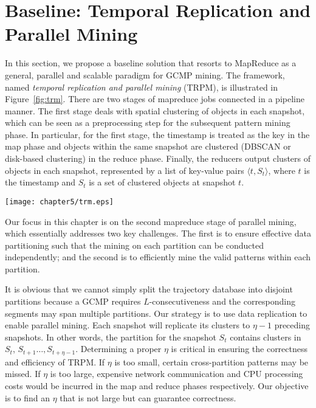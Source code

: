 \section{Baseline: Temporal Replication and Parallel Mining}
\label{sec:trm}
In this section, we propose a baseline solution that resorts to MapReduce as a general, parallel and scalable paradigm for GCMP mining. The framework, named \textit{temporal replication and parallel mining} (TRPM), is illustrated in Figure~\ref{fig:trm}. There are two stages of mapreduce jobs connected in a pipeline manner. The first stage deals with spatial clustering of objects in each snapshot, which can be seen as a preprocessing step for the subsequent pattern mining phase. In particular, for the first stage, the timestamp is treated as the key in the map phase and objects within the same snapshot are clustered (DBSCAN or disk-based clustering) in the reduce phase. Finally, the reducers output clusters of objects in each snapshot, represented by a list of key-value pairs $\langle t, S_t  \rangle$, where $t$ is the timestamp and $S_t$ is a set of clustered objects at snapshot $t$. 

\begin{figure*} [t]
\center
\texttt{[image: chapter5/trm.eps]}
\caption{Workflow of Temporal Replication and Parallel Mining (TRPM). (a) and (b) correspond to the first mapreduce stage which clusters objects in each snapshot.  (c) and (d) is the second mapreduce stage which uses TRPM to detect GCMPs.}
\label{fig:trm}
\end{figure*}

Our focus in this chapter is on the second mapreduce stage of parallel mining, which essentially addresses two key challenges. The first is to ensure effective data partitioning such that the mining on each partition can be conducted independently; and the second is to efficiently mine the valid patterns within each partition. 

It is obvious that we cannot simply split the trajectory database 
into disjoint partitions because a GCMP requires $L$-consecutiveness 
and the corresponding segments may span multiple partitions. 
Our strategy is to use data replication to enable parallel mining. 
Each snapshot will replicate its clusters to $\eta-1$ preceding snapshots.
In other words, the partition for the snapshot $S_t$ contains clusters 
in $S_t$, $S_{t+1}\ldots,S_{t+\eta-1}$. 
Determining a proper $\eta$ is critical in ensuring the
correctness and efficiency of TRPM. If $\eta$ is too small, 
certain cross-partition patterns may be missed. 
If $\eta$ is too large, expensive network communication and 
CPU processing costs would be incurred in the map and reduce phases respectively. Our objective is to find an $\eta$ that is not large but can guarantee correctness.

